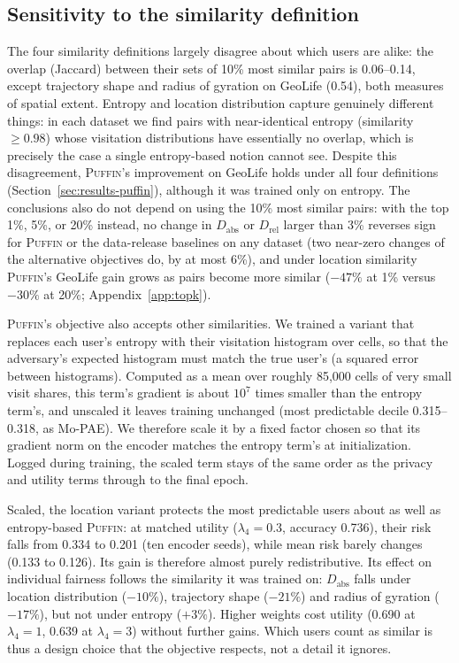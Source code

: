 \documentclass[sigconf,anonymous,review]{acmart}
\newcommand{\puffin}{\textsc{Puffin}}
\begin{document}
\subsection{Sensitivity to the similarity definition}
\label{sec:results-similarity}
The four similarity definitions largely disagree about which users are alike: the overlap (Jaccard) between their sets of 10\% most similar pairs is 0.06--0.14, except trajectory shape and radius of gyration on GeoLife (0.54), both measures of spatial extent. Entropy and location distribution capture genuinely different things: in each dataset we find pairs with near-identical entropy (similarity $\geq 0.98$) whose visitation distributions have essentially no overlap, which is precisely the case a single entropy-based notion cannot see. Despite this disagreement, \puffin's improvement on GeoLife holds under all four definitions (Section~\ref{sec:results-puffin}), although it was trained only on entropy. The conclusions also do not depend on using the 10\% most similar pairs: with the top 1\%, 5\%, or 20\% instead, no change in $D_{\mathrm{abs}}$ or $D_{\mathrm{rel}}$ larger than 3\% reverses sign for \puffin{} or the data-release baselines on any dataset (two near-zero changes of the alternative objectives do, by at most 6\%), and under location similarity \puffin's GeoLife gain grows as pairs become more similar ($-47\%$ at 1\% versus $-30\%$ at 20\%; Appendix~\ref{app:topk}).

\puffin's objective also accepts other similarities. We trained a variant that replaces each user's entropy with their visitation histogram over cells, so that the adversary's expected histogram must match the true user's (a squared error between histograms). Computed as a mean over roughly 85{,}000 cells of very small visit shares, this term's gradient is about $10^{7}$ times smaller than the entropy term's, and unscaled it leaves training unchanged (most predictable decile 0.315--0.318, as Mo-PAE). We therefore scale it by a fixed factor chosen so that its gradient norm on the encoder matches the entropy term's at initialization. Logged during training, the scaled term stays of the same order as the privacy and utility terms through to the final epoch.

Scaled, the location variant protects the most predictable users about as well as entropy-based \puffin{}: at matched utility ($\lambda_4=0.3$, accuracy 0.736), their risk falls from 0.334 to 0.201 (ten encoder seeds), while mean risk barely changes (0.133 to 0.126). Its gain is therefore almost purely redistributive. Its effect on individual fairness follows the similarity it was trained on: $D_{\mathrm{abs}}$ falls under location distribution ($-10\%$), trajectory shape ($-21\%$) and radius of gyration ($-17\%$), but not under entropy ($+3\%$). Higher weights cost utility (0.690 at $\lambda_4=1$, 0.639 at $\lambda_4=3$) without further gains. Which users count as similar is thus a design choice that the objective respects, not a detail it ignores.
\end{document}
